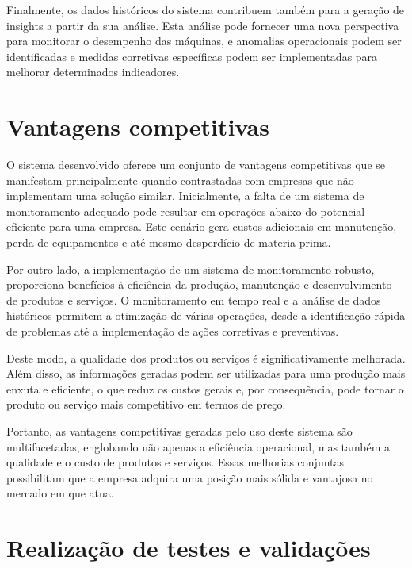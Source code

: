 Finalmente, os dados históricos do sistema contribuem também para a geração de insights a partir da sua análise. Esta análise pode fornecer uma nova perspectiva para monitorar o desempenho das máquinas, e anomalias operacionais podem ser identificadas e medidas corretivas específicas podem ser implementadas para melhorar determinados indicadores.

\section{Vantagens competitivas}\label{sec:competitive}
O sistema desenvolvido oferece um conjunto de vantagens competitivas que se manifestam principalmente quando contrastadas com empresas que não implementam uma solução similar. Inicialmente, a falta de um sistema de monitoramento adequado pode resultar em operações abaixo do potencial eficiente para uma empresa. Este cenário gera custos adicionais em manutenção, perda de equipamentos e até mesmo desperdício de materia prima.

Por outro lado, a implementação de um sistema de monitoramento robusto, proporciona benefícios à eficiência da produção, manutenção e desenvolvimento de produtos e serviços. O monitoramento em tempo real e a análise de dados históricos permitem a otimização de várias operações, desde a identificação rápida de problemas até a implementação de ações corretivas e preventivas. 

Deste modo, a qualidade dos produtos ou serviços é significativamente melhorada. Além disso, as informações geradas podem ser utilizadas para uma produção mais enxuta e eficiente, o que reduz os custos gerais e, por consequência, pode tornar o produto ou serviço mais competitivo em termos de preço.

Portanto, as vantagens competitivas geradas pelo uso deste sistema são multifacetadas, englobando não apenas a eficiência operacional, mas também a qualidade e o custo de produtos e serviços. Essas melhorias conjuntas possibilitam que a empresa adquira uma posição mais sólida e vantajosa no mercado em que atua.

\section{Realização de testes e validações}\label{sec:tests}

